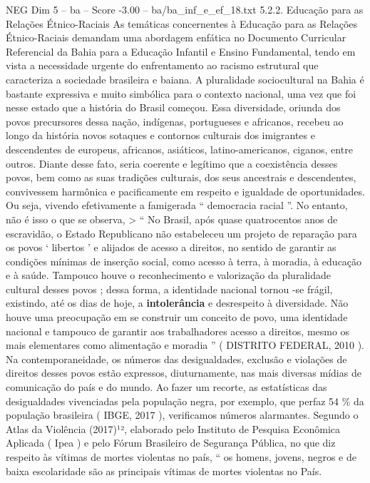 \begin{textsample}{NEG Dim 5 – ba – Score -3.00 – ba/ba\_inf\_e\_ef\_18.txt}  \label{ex:f5_neg_006}
5.2.2.
Educação para as Relações Étnico-Raciais As temáticas concernentes à Educação para as Relações Étnico-Raciais demandam uma abordagem enfática no Documento Curricular Referencial da Bahia para a Educação Infantil e Ensino Fundamental, tendo em vista a necessidade urgente do enfrentamento ao racismo estrutural que caracteriza a sociedade brasileira e baiana.
A pluralidade sociocultural na Bahia é bastante expressiva e muito simbólica para o contexto nacional, uma vez que foi nesse estado que a história do Brasil começou.
Essa diversidade, oriunda dos povos precursores dessa nação, indígenas, portugueses e africanos, recebeu ao longo da história novos sotaques e contornos culturais dos imigrantes e descendentes de europeus, africanos, asiáticos, latino-americanos, ciganos, entre outros.
Diante desse fato, seria coerente e legítimo que a coexistência desses povos, bem como as suas tradições culturais, dos seus ancestrais e descendentes, convivessem harmônica e pacificamente em respeito e igualdade de oportunidades.
Ou seja, vivendo efetivamente a famigerada “ democracia racial ”.
No entanto, não é isso o que se observa, > “ No Brasil, após quase quatrocentos anos de escravidão, o Estado Republicano não estabeleceu um projeto de reparação para os povos ‘ libertos ’ e alijados de acesso a direitos, no sentido de garantir as condições mínimas de inserção social, como acesso à terra, à moradia, à educação e à saúde.
Tampouco houve o reconhecimento e valorização da pluralidade cultural desses povos ; dessa forma, a identidade nacional tornou -se frágil, existindo, até os dias de hoje, a \textbf{intolerância} e desrespeito à diversidade.
Não houve uma preocupação em se construir um conceito de povo, uma identidade nacional e tampouco de garantir aos trabalhadores acesso a direitos, mesmo os mais elementares como alimentação e moradia ” ( DISTRITO FEDERAL, 2010 ).
Na contemporaneidade, os números das desigualdades, exclusão e violações de direitos desses povos estão expressos, diuturnamente, nas mais diversas mídias de comunicação do país e do mundo.
Ao fazer um recorte, as estatísticas das desigualdades vivenciadas pela população negra, por exemplo, que perfaz 54 \% da população brasileira ( IBGE, 2017 ), verificamos números alarmantes.
Segundo o Atlas da Violência (2017)¹², elaborado pelo Instituto de Pesquisa Econômica Aplicada ( Ipea ) e pelo Fórum Brasileiro de Segurança Pública, no que diz respeito às vítimas de mortes violentas no país, “ os homens, jovens, negros e de baixa escolaridade são as principais vítimas de mortes violentas no País.

\end{textsample}
